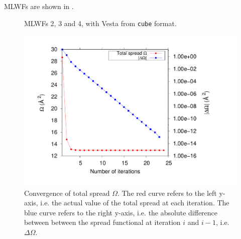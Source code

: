 \begin{itemize}
MLWFs are shown in .

\begin{figure}[h!]
\centering
{}
\centering
{}
\centering
{}
\caption{MLWFs 2, 3 and 4, with Vesta from {\tt cube} format.}\label{fig12.2}
\end{figure}
\end{itemize}

\begin{figure}[t!]
\centering
\includegraphics[width=0.7\columnwidth]{figure/example12/spread_convergence.pdf}
\caption{Convergence of total spread $\Omega$. The red curve refers to the left y-axis, i.e. the actual value of the total spread at each iteration. The blue curve refers to the right y-axis, i.e. the absolute difference between between the spread functional at iteration $i$ and $i-1$, i.e. $\Delta\Omega$.}\label{fig12.1}
\end{figure}

